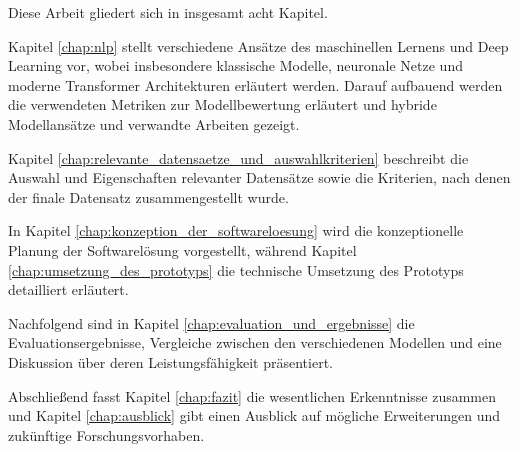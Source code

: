 Diese Arbeit gliedert sich in insgesamt acht Kapitel. 

Kapitel \ref{chap:nlp} stellt verschiedene Ansätze des maschinellen Lernens und Deep Learning vor, 
wobei insbesondere klassische Modelle, neuronale Netze und moderne Transformer Architekturen erläutert werden. 
Darauf aufbauend werden die verwendeten Metriken zur Modellbewertung erläutert und hybride Modellansätze und verwandte Arbeiten gezeigt.

Kapitel \ref{chap:relevante_datensaetze_und_auswahlkriterien} beschreibt die Auswahl und Eigenschaften relevanter Datensätze sowie die Kriterien, 
nach denen der finale Datensatz zusammengestellt wurde. 

In Kapitel \ref{chap:konzeption_der_softwareloesung} wird die konzeptionelle Planung der Softwarelösung vorgestellt, 
während Kapitel \ref{chap:umsetzung_des_prototyps} die technische Umsetzung des Prototyps detailliert erläutert.

Nachfolgend sind in Kapitel \ref{chap:evaluation_und_ergebnisse} die Evaluationsergebnisse, Vergleiche zwischen den verschiedenen Modellen und 
eine Diskussion über deren Leistungsfähigkeit präsentiert.

Abschließend fasst Kapitel \ref{chap:fazit} die wesentlichen Erkenntnisse zusammen und 
Kapitel \ref{chap:ausblick} gibt einen Ausblick auf mögliche Erweiterungen und zukünftige Forschungsvorhaben.



